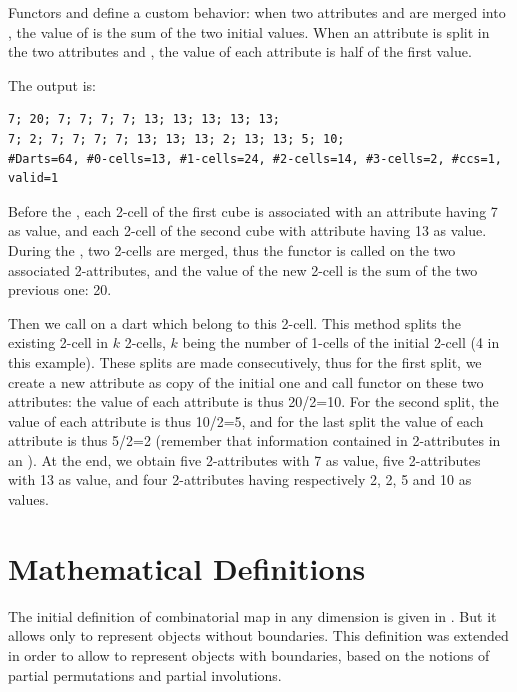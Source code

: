 Functors  and  define a
custom behavior: when two attributes  and  are
merged into , the value of  is the sum of the
two initial values.  When an attribute  is split in the two
attributes  and , the value of each attribute is
half of the first value.


The output is:
\begin{verbatim}
7; 20; 7; 7; 7; 7; 13; 13; 13; 13; 13; 
7; 2; 7; 7; 7; 7; 13; 13; 13; 2; 13; 13; 5; 10; 
#Darts=64, #0-cells=13, #1-cells=24, #2-cells=14, #3-cells=2, #ccs=1, valid=1
\end{verbatim}

Before the , each 2-cell of the first cube is
associated with an attribute having 7 as value, and each 2-cell of the
second cube with attribute having 13 as value. During the
, two 2-cells are merged, thus the functor
 is called on the two associated 2-attributes, and
the value of the new 2-cell is the sum of the two previous one: 20.

Then we call  on a dart which
belong to this 2-cell. This method splits the existing 2-cell in $k$
2-cells, $k$ being the number of 1-cells of the initial 2-cell (4 in
this example). These splits are made consecutively, thus for the first
split, we create a new attribute as copy of the initial one and call
functor  on these two attributes: the value
of each attribute is thus 20/2=10. For the second split, the value of
each attribute is thus 10/2=5, and for the last split the value of
each attribute is thus 5/2=2 (remember that information contained in
2-attributes in an ).  At the end, we obtain five
2-attributes with 7 as value, five 2-attributes with 13 as value, and
four 2-attributes having respectively 2, 2, 5 and 10 as values.

\section{Mathematical Definitions}\label{sec_definition}
The initial definition of combinatorial map in any dimension is given
in \cite{cgal:l-tmbrc-91,l-ndgcm-94}. But it allows only to represent
objects without boundaries. This definition was extended
\cite{cgal:pabl-cco-07,cgal:d-ccccg-10} in order to allow to represent 
objects with boundaries, based on the notions of partial permutations 
and partial involutions.

